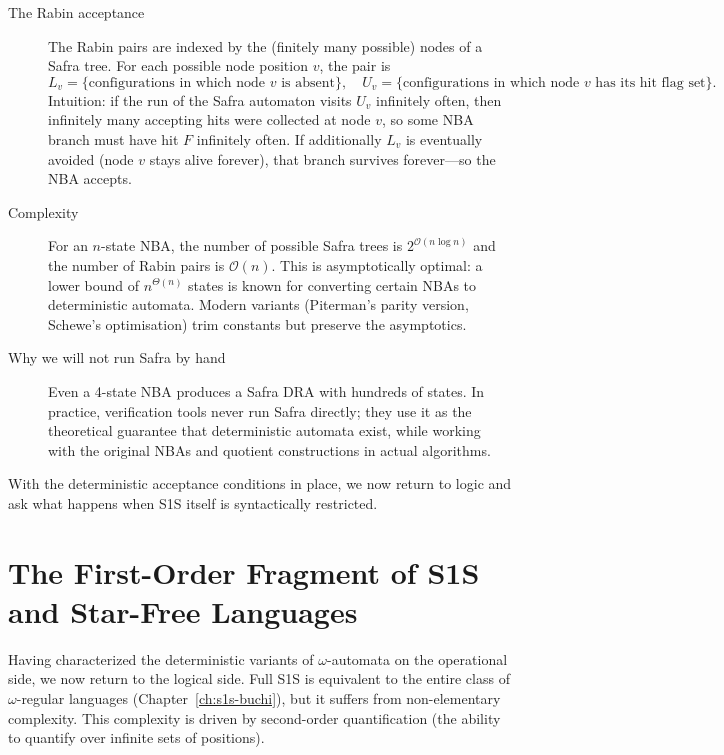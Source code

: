 \begin{formaldetails}
\begin{description}
    \item[The Rabin acceptance] The Rabin pairs are indexed by the (finitely many possible) nodes of a Safra tree. For each possible node position $v$, the pair is
$$L_v = \{\text{configurations in which node } v \text{ is absent}\}, \quad U_v = \{\text{configurations in which node } v \text{ has its hit flag set}\}.$$
Intuition: if the run of the Safra automaton visits $U_v$ infinitely often, then infinitely many accepting hits were collected at node $v$, so some NBA branch must have hit $F$ infinitely often. If additionally $L_v$ is eventually avoided (node $v$ stays alive forever), that branch survives forever---so the NBA accepts.

    \item[Complexity] For an $n$-state NBA, the number of possible Safra trees is $2^{\mathcal{O}(n \log n)}$ and the number of Rabin pairs is $\mathcal{O}(n)$. This is asymptotically optimal: a lower bound of $n^{\Theta(n)}$ states is known for converting certain NBAs to deterministic automata. Modern variants (Piterman's parity version, Schewe's optimisation) trim constants but preserve the asymptotics.

    \item[Why we will not run Safra by hand] Even a 4-state NBA produces a Safra DRA with hundreds of states. In practice, verification tools never run Safra directly; they use it as the theoretical guarantee that deterministic automata exist, while working with the original NBAs and quotient constructions in actual algorithms.
\end{description}
\end{formaldetails}

With the deterministic acceptance conditions in place, we now return to logic and ask what happens when S1S itself is syntactically restricted.

\section{The First-Order Fragment of S1S and Star-Free Languages}
\label{sec:fo-star-free}

Having characterized the deterministic variants of $\omega$-automata on the operational side, we now return to the logical side. Full S1S is equivalent to the entire class of $\omega$-regular languages (Chapter~\ref{ch:s1s-buchi}), but it suffers from non-elementary complexity. This complexity is driven by second-order quantification (the ability to quantify over infinite sets of positions).

